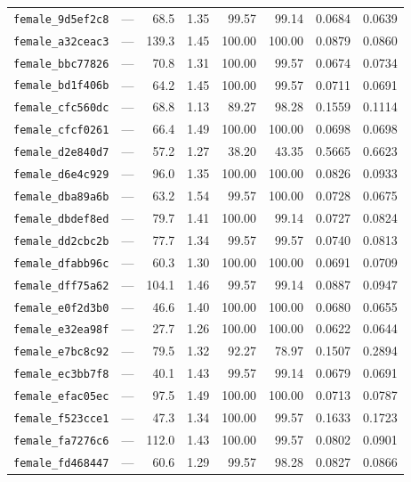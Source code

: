 \begin{longtable}{lrrrrrrr}
\texttt{female\_9d5ef2c8} & --- & 68.5 & 1.35 & 99.57 & 99.14 & 0.0684 & 0.0639 \\
\texttt{female\_a32ceac3} & --- & 139.3 & 1.45 & 100.00 & 100.00 & 0.0879 & 0.0860 \\
\texttt{female\_bbc77826} & --- & 70.8 & 1.31 & 100.00 & 99.57 & 0.0674 & 0.0734 \\
\texttt{female\_bd1f406b} & --- & 64.2 & 1.45 & 100.00 & 99.57 & 0.0711 & 0.0691 \\
\texttt{female\_cfc560dc} & --- & 68.8 & 1.13 & 89.27 & 98.28 & 0.1559 & 0.1114 \\
\texttt{female\_cfcf0261} & --- & 66.4 & 1.49 & 100.00 & 100.00 & 0.0698 & 0.0698 \\
\texttt{female\_d2e840d7} & --- & 57.2 & 1.27 & 38.20 & 43.35 & 0.5665 & 0.6623 \\
\texttt{female\_d6e4c929} & --- & 96.0 & 1.35 & 100.00 & 100.00 & 0.0826 & 0.0933 \\
\texttt{female\_dba89a6b} & --- & 63.2 & 1.54 & 99.57 & 100.00 & 0.0728 & 0.0675 \\
\texttt{female\_dbdef8ed} & --- & 79.7 & 1.41 & 100.00 & 99.14 & 0.0727 & 0.0824 \\
\texttt{female\_dd2cbc2b} & --- & 77.7 & 1.34 & 99.57 & 99.57 & 0.0740 & 0.0813 \\
\texttt{female\_dfabb96c} & --- & 60.3 & 1.30 & 100.00 & 100.00 & 0.0691 & 0.0709 \\
\texttt{female\_dff75a62} & --- & 104.1 & 1.46 & 99.57 & 99.14 & 0.0887 & 0.0947 \\
\texttt{female\_e0f2d3b0} & --- & 46.6 & 1.40 & 100.00 & 100.00 & 0.0680 & 0.0655 \\
\texttt{female\_e32ea98f} & --- & 27.7 & 1.26 & 100.00 & 100.00 & 0.0622 & 0.0644 \\
\texttt{female\_e7bc8c92} & --- & 79.5 & 1.32 & 92.27 & 78.97 & 0.1507 & 0.2894 \\
\texttt{female\_ec3bb7f8} & --- & 40.1 & 1.43 & 99.57 & 99.14 & 0.0679 & 0.0691 \\
\texttt{female\_efac05ec} & --- & 97.5 & 1.49 & 100.00 & 100.00 & 0.0713 & 0.0787 \\
\texttt{female\_f523cce1} & --- & 47.3 & 1.34 & 100.00 & 99.57 & 0.1633 & 0.1723 \\
\texttt{female\_fa7276c6} & --- & 112.0 & 1.43 & 100.00 & 99.57 & 0.0802 & 0.0901 \\
\texttt{female\_fd468447} & --- & 60.6 & 1.29 & 99.57 & 98.28 & 0.0827 & 0.0866 \\

\end{longtable}
